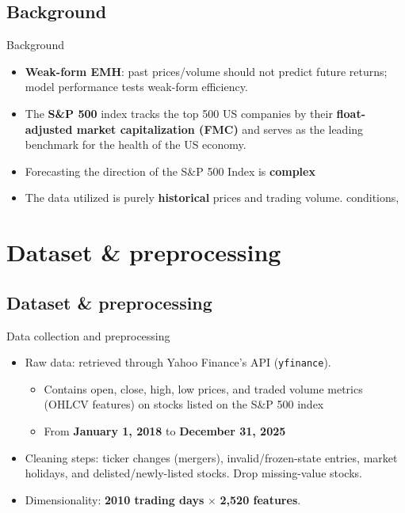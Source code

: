 \documentclass[aspectratio=43]{beamer} %
\begin{document}
\subsection{Background}
\begin{frame}{Background}
\begin{itemize}
  \item \textbf{Weak-form EMH}: past prices/volume should not predict future returns; model performance tests weak-form efficiency.
  \item The \textbf{S\&P 500} index tracks the top 500 US companies by their \textbf{float-adjusted market capitalization (FMC)} and serves as the leading benchmark for the health of the US economy.
  \item Forecasting the direction of the S\&P 500 Index is \textbf{complex} %
  \item The data utilized is purely \textbf{historical} prices and trading volume. %
conditions,
\end{itemize}
\end{frame}






\section{Dataset \& preprocessing}
\subsection{Dataset \& preprocessing}
\begin{frame}{Data collection and preprocessing}
\begin{itemize}
  \item Raw data: retrieved through Yahoo Finance's API (\texttt{yfinance}). 
  \begin{itemize}
    \item Contains open, close, high, low prices, and traded volume metrics (OHLCV features) on stocks listed on the S\&P 500 index
    \item From \textbf{January 1, 2018} to \textbf{December 31, 2025}
  \end{itemize}
  \item Cleaning steps: ticker changes (mergers), invalid/frozen-state entries, market holidays, and delisted/newly-listed stocks. Drop missing-value stocks.
  \item Dimensionality: \textbf{2010 trading days} $\times$ \textbf{2,520 features}.
\end{itemize}
\end{frame}
\end{document}
